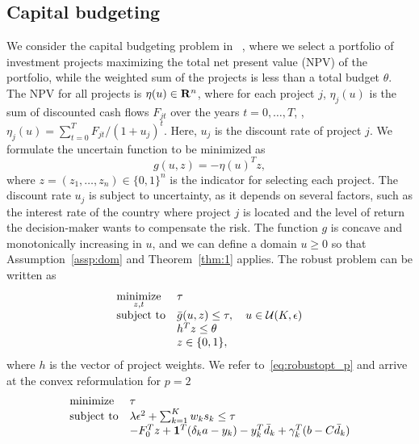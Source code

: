 {\subsection{Capital budgeting}
\label{sub:capitalbudget}
We consider the capital budgeting problem in ~\cite[Section 4.2]{ben-tal_deriving_2015}, where we select a portfolio of investment projects maximizing the total net present value (NPV) of the portfolio, while the weighted sum of the projects is less than a total budget $\theta$.
The NPV for all projects is $\eta(u) \in {\mathbf R}^n$, where for each project $j$, $\eta_j(u)$ is the sum of discounted cash flows $F_{jt}$ over the years $t = 0,\dots, T$, \ie, $\eta_j(u) = \sum_{t = 0}^T F_{jt}/(1+u_j)^t$. Here, $u_j$ is the discount rate of project $j$.
We formulate the uncertain function to be minimized as
\begin{equation*}
	 g(u,z) = -\eta(u)^Tz,
\end{equation*}
where $z = (z_1, \dots, z_n) \in \{0,1\}^n$ is the indicator for selecting each project.
The discount rate $u_j$ is subject to uncertainty, as it depends on several factors, such as the interest rate of the country where project $j$ is located and the level of return the decision-maker wants to compensate the risk.
The function $g$ is concave and monotonically increasing in $u$, and we can define a domain $u \geq 0$ so that Assumption~\ref{assp:dom} and Theorem~\ref{thm:1} applies.
The robust problem can be written as
\begin{equation*}
	\begin{array}{ll}
	\underset{z, t}{\text{minimize}} & \tau\\
	\text{subject to} & \bar{g}(u,z) \leq \tau,\quad u \in {\mathcal{U}}(K,\epsilon)\\
	& h^Tz \leq \theta\\
& z\in \{0,1\},
\end{array}
\end{equation*}
where $h$ is the vector of project weights. We refer to~\eqref{eq:robustopt_p} and arrive at the convex reformulation for $p =2$
\begin{equation}
	\label{eq:capital}
	\begin{array}{ll}
	\text{minimize} & \tau\\
	\text{subject to} & \lambda \epsilon^2 + \sum^{K}_{k=1} w_k s_k \leq \tau\\
	& - F_{0}^Tz + \mathbf 1^T(\delta_{k}a - y_{k}) - y_k^T\bar{d}_k + \gamma_k^T(b - C\bar{d}_k) \\

\end{array}
\end{equation}}
